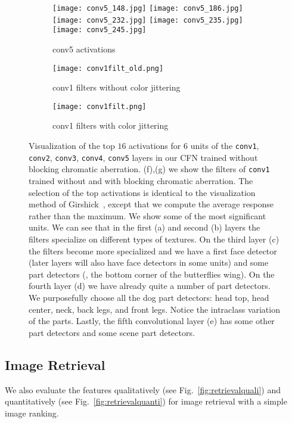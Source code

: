 \documentclass[runningheads]{llncs}
\begin{document}
\begin{figure}[t!]
\begin{center}
\begin{subfigure}{0.49\textwidth}
\texttt{[image: conv5\_148.jpg]}
\texttt{[image: conv5\_186.jpg]}
\texttt{[image: conv5\_232.jpg]}
\texttt{[image: conv5\_235.jpg]}
\texttt{[image: conv5\_245.jpg]}
\caption{conv5 activations}
\end{subfigure}
\begin{subfigure}{0.49\textwidth}
\texttt{[image: conv1filt\_old.png]}
\caption{conv1 filters without color jittering }
\end{subfigure}
\begin{subfigure}{0.49\textwidth}
\texttt{[image: conv1filt.png]}
\caption{conv1 filters with color jittering}
\end{subfigure}

\caption{Visualization of the top $16$ activations for $6$ units of the \texttt{conv1}, \texttt{conv2}, \texttt{conv3}, \texttt{conv4}, \texttt{conv5} layers in our CFN trained without blocking chromatic aberration. (f),(g) we show the filters of \texttt{conv1} trained without and with blocking chromatic aberration. The selection of the top activations is identical to the visualization method of Girshick~\etal \cite{GirshickDDM2014}, except that we compute the average response rather than the maximum. We show some of the most significant units. We can see that in the first (a) and second (b) layers the filters specialize on different types of textures. On the third layer (c) the filters become more specialized and we have a first face detector (later layers will also have face detectors in some units) and some part detectors (\eg, the bottom corner of the butterflies wing). On the fourth layer (d) we have already quite a number of part detectors. We purposefully choose all the dog part detectors: head top, head center, neck, back legs, and front legs. Notice the intraclass variation of the parts. Lastly, the fifth convolutional layer (e) has some other part detectors and some scene part detectors.} \label{fig:activations}
\end{center}
\end{figure}

\subsection{Image Retrieval}  
We also evaluate the features qualitatively (see Fig.~\ref{fig:retrievalquali}) and quantitatively (see Fig.~\ref{fig:retrievalquanti}) for image retrieval with a simple image ranking.
\end{document}
